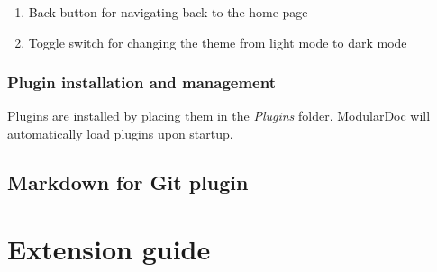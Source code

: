 \begin{enumerate}
    \item Back button for navigating back to the home page
    \item Toggle switch for changing the theme from light mode to dark mode
\end{enumerate}

\subsubsection{Plugin installation and management}

Plugins are installed by placing them in the \textit{Plugins} folder. ModularDoc will automatically load plugins upon startup.

\subsection{Markdown for Git plugin}

\section{Extension guide}


